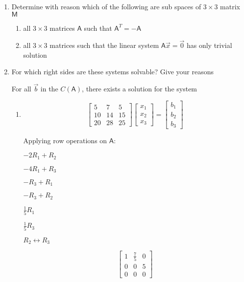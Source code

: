 \documentclass[a4paper, 11pt]{article}
\newcommand{\mat}[1]{\boldsymbol { \mathsf{#1}} }
\begin{document}
\begin{enumerate}
\item Determine with reason which of the following are sub spaces of $3 \times 3$ matrix $\mat M$
\begin{enumerate}[label=(\alph*)]
\item all $3 \times 3$ matrices $\mat A$ such that $\mat A^T = -\mat A$
\item all $3 \times 3$ matrices such that the linear system $\mat A \vec x = \vec 0$ has only trivial solution
\end{enumerate}



\item For which right sides are these systems solvable? Give your reasons

For all $\vec b$ in the $C(\mat A)$, there exists a solution for the system

\begin{enumerate}
\item
\[ 
\left[ \begin{array}{ccc}
5  &   7 &  5\\
10  &   14 &  15\\
20 & 28 & 25
\end{array} \right]
%
\left[ \begin{array}{c}
 x_1\\
 x_2\\
x_3 
\end{array} \right]
%
= \left[ \begin{array}{c}
 b_1\\
 b_2\\
 b_3 
\end{array} \right]
\]

Applying row operations on $\mat A$: 

\begin{center}
$-2R_1 + R_2$

$-4R_1 + R_3$

$-R_3 + R_1$

$-R_3 + R_2$

$\frac{1}{5} R_1$

$\frac{1}{5} R_3$

$ R_2 \leftrightarrow R_3$
\end{center}


\[ 
\left[ \begin{array}{ccc}
1  & \frac{7}{5} &  0\\
0  &   0 &  5\\
0 & 0 & 0
\end{array} \right]
\]


\end{enumerate}
\end{enumerate}
\end{document}
